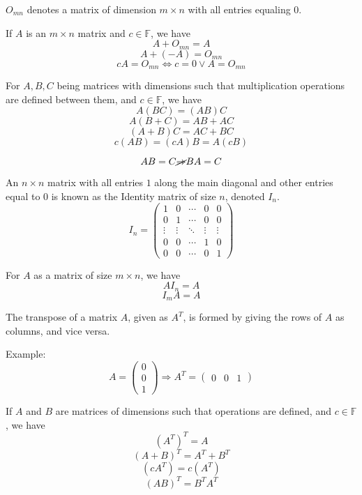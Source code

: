 \begin{definition}\label{def:1}
	$O_{mn}$ denotes a matrix of dimension $m\times n$ with all entries equaling $0$.
\end{definition}
\begin{theorem}\label{thm:1}
	If $A$ is an $m\times n$ matrix and $c\in\mathbb{F}$, we have
	$$A+O_{mn}=A$$
	$$A+(-A)=O_{mn}$$
	$$cA=O_{mn}\Leftrightarrow c=0\lor A=O_{mn}$$
\end{theorem}
\begin{theorem}\label{thm:2}
	For $A,B,C$ being matrices with dimensions such that multiplication operations are defined between them, and $c\in\mathbb{F}$, we have
	$$A(BC)=(AB)C$$
	$$A(B+C)=AB+AC$$
	$$(A+B)C=AC+BC$$
	$$c(AB)=(cA)B=A(cB)$$
\end{theorem}
\begin{remark}
	$$AB=C\cancel{\Rightarrow}BA=C$$
\end{remark}
\begin{definition}\label{def:2}
	An $n\times n$ matrix with all entries $1$ along the main diagonal and other entries equal to $0$ is known as the Identity matrix of size $n$, denoted $I_n$.
	$$I_n=\begin{pmatrix}
		1&0&\cdots&0&0\\
		0&1&\cdots&0&0\\
		\vdots&\vdots&\ddots&\vdots&\vdots\\
		0&0&\cdots&1&0\\
		0&0&\cdots&0&1
	\end{pmatrix}$$
\end{definition}
\begin{theorem}\label{thm:3}
	For $A$ as a matrix of size $m\times n$, we have
	$$AI_n=A$$
	$$I_mA=A$$
\end{theorem}
\begin{definition}\label{def:3}
	The transpose of a matrix $A$, given as $A^T$, is formed by giving the rows of $A$ as columns, and vice versa.
\end{definition}
Example:
$$A=\begin{pmatrix}0\\0\\1\end{pmatrix}\Longrightarrow A^T=\begin{pmatrix}0&0&1\end{pmatrix}$$
\begin{theorem}\label{thm:4}
	If $A$ and $B$ are matrices of dimensions such that operations are defined, and $c\in\mathbb{F}$, we have
	$$(A^T)^T=A$$
	$$(A+B)^T=A^T+B^T$$
	$$(cA^T)=c(A^T)$$
	$$(AB)^T=B^TA^T$$
\end{theorem}
